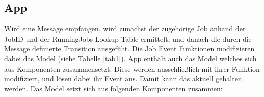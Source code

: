 \subsection{App}
\label{app}
Wird eine Message empfangen, wird zunächst der zugehörige Job anhand der JobID und der RunningJobs Lookup Table ermittelt, und danach die durch die Message definierte Transition ausgefüht.
Die Job Event Funktionen modifizieren dabei das Model (siehe Tabelle \ref{tab1}).
App enthält auch das Model welches sich aus  Komponenten zusammensetzt.
Diese werden ausschließlich mit ihrer  Funktion modifiziert, und lösen dabei ihr  Event aus.
Damit kann das \UI{} aktuell gehalten werden.
Das Model setzt sich aus folgenden  Komponenten zusammen:


